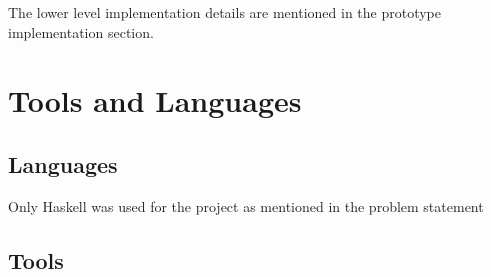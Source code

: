\documentclass{scrreprt}
\begin{document}
The lower level implementation details are mentioned in the prototype implementation section.












\chapter {Tools and Languages}


\section{Languages}

Only Haskell was used for the project as mentioned in the problem statement

\section{Tools}
\end{document}
